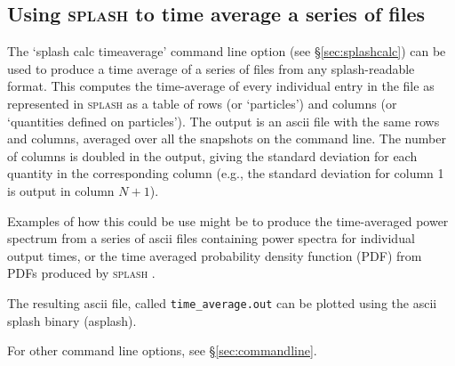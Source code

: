 \documentclass[a4paper,10pt]{article}
\newcommand{\splash}{\textsc{splash }}
\begin{document}
\subsection{Using \splash to time average a series of files}
 The `splash calc timeaverage' command line option (see \S\ref{sec:splashcalc}) can be used to produce a time average of a series of files from any splash-readable format. This computes the time-average of every individual entry in the file as represented in \splash as a table of rows (or `particles') and columns (or `quantities defined on particles'). The output is an ascii file with the same rows and columns, averaged over all the snapshots on the command line. The number of columns is doubled in the output, giving the standard deviation for each quantity in the corresponding column (e.g., the standard deviation for column 1 is output in column $N + 1$).
 
 Examples of how this could be use might be to produce the time-averaged power spectrum from a series of ascii files containing power spectra for individual output times, or the time averaged probability density function (PDF) from PDFs produced by \splash.
 
 The resulting ascii file, called \verb+time_average.out+ can be plotted using the ascii splash binary (asplash).

 For other command line options, see \S\ref{sec:commandline}.

%
%
\end{document}
